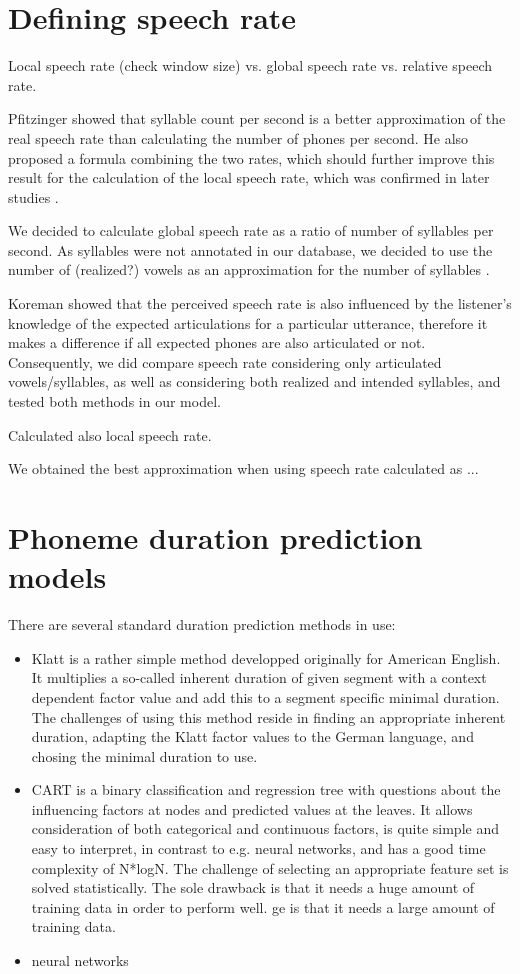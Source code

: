 \documentclass[a4paper]{scrreprt}
\begin{document}
\chapter{Defining speech rate}

Local speech rate (check window size) vs. global speech rate vs. relative speech rate.

Pfitzinger \cite{Pfitzinger1998} showed that syllable count per second is a better approximation of the real speech rate than calculating the number of phones per second. He also proposed a formula combining the two rates, which should further improve this result for the calculation of the local speech rate, which was confirmed in later studies \cite{Pfitzinger1999}.

We decided to calculate global speech rate as a ratio of number of syllables per second. As syllables were not annotated in our database, we decided to use the number of (realized?) vowels as an approximation for the number of syllables \cite{Yishan_Jiao_2015} \cite{Kohler1995}.

Koreman showed \cite{Koreman_2006} that the perceived speech rate is also influenced by the listener's knowledge of the expected articulations for a particular utterance, therefore it makes a difference if all expected phones are also articulated or not. Consequently, we did compare speech rate considering only articulated vowels/syllables, as well as considering both realized and intended syllables,  and tested both methods in our model.

Calculated also local speech rate.

We obtained the best approximation when using speech rate calculated as ...

\chapter{Phoneme duration prediction models}
There are several standard duration prediction methods in use: 
\begin{itemize}
	\item Klatt is a rather simple method developped originally for American English. It multiplies a so-called inherent duration of given segment with a context dependent factor value and add this to a segment specific minimal duration. The challenges of using this method reside in finding an appropriate inherent duration, adapting the Klatt factor values to the German language, and chosing the minimal duration to use.
	\item CART \cite{Riley1992} is a binary classification and regression tree with questions about the influencing factors at nodes and predicted values at the leaves. It allows consideration of both categorical and continuous factors, is quite simple and easy to interpret, in contrast to e.g. neural networks, and has a good time complexity of N*logN. The challenge of selecting an appropriate feature set is solved statistically. The sole drawback is that it needs a huge amount of training data in order to perform well.
ge is that it needs a large amount of training data.
	\item neural networks
\end{itemize}
\end{document}
